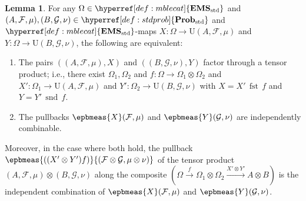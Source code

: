 \documentclass[
  sigconf,
  screen, ]{acmart}
\theoremstyle{definition}
\newtheorem{lemma}[theorem]{Lemma}
\newcommand\calF{\mathcal F}
\newcommand\calG{\mathcal G}
\newcommand\nref[2]{\hyperref[#1]{#2}} \newcommand\checkhigh{{\huge{\color{red}\textbf{TODO: check}}}}
\newcommand\scmfst{\mathop{\nref{app:def:semicartesian-monoidal-category}{\mathrm{fst}}}}
\newcommand\scmsnd{\mathop{\nref{app:def:semicartesian-monoidal-category}{\mathrm{snd}}}}
\newcommand\texforgetmu{\mathrm{U}}
\newcommand\forgetmu{{\nref{def:forgetmu}{\texforgetmu}}}
\newcommand\texStdProb{\mathbf{Prob}_{\rm std}}
\newcommand\StdProb{{\nref{def:stdprob}{\texStdProb}}}
\newcommand\texStdMble{\mathbf{EMS}_{\rm std}}
\newcommand\StdMble{{\nref{def:mblecat}{\texStdMble}}}
\begin{document}
\begin{lemma} \label{app:lem:factor-through-tensor-iff-indep-combable}
  For any $\Omega\in\StdMble$ 
  and $(A,\calF,\mu),(B,\calG,\nu)\in\StdProb$
  and $\StdMble$-maps $X:\Omega\to\forgetmu(A,\calF,\mu)$
  and $Y:\Omega\to\forgetmu(B,\calG,\nu)$,
  the following are equivalent: \begin{enumerate}
    \item The pairs $((A,\calF,\mu),X)$ and $((B,\calG,\nu),Y)$
      factor through a tensor product;
      i.e., there exist $\Omega_1,\Omega_2$ and $f : \Omega\to\Omega_1\otimes\Omega_2$
      and $X':\Omega_1\to \forgetmu{(A,\calF,\mu)}$
      and $Y':\Omega_2\to\forgetmu{(B,\calG,\nu)}$
      with $X = X'\,\scmfst\,f$
      and $Y = Y'\,\scmsnd\,f$.
    \item The pullbacks $\epbmeas{X}(\calF,\mu)$
     and $\epbmeas{Y}(\calG,\nu)$ are independently combinable.
  \end{enumerate}
  Moreover, in the case where both hold,
  the pullback $\epbmeas{((X'\otimes Y')f)}{(\calF\otimes\calG,\mu\otimes\nu)}$
  of the tensor product $(A,\calF,\mu)\otimes(B,\calG,\nu)$
  along the composite $\left(\Omega\xrightarrow f\Omega_1\otimes\Omega_2 \xrightarrow{X'\otimes Y'}A\otimes B\right)$
  is the independent combination of
    $\epbmeas{X}(\calF,\mu)$
     and $\epbmeas{Y}(\calG,\nu)$.
\end{lemma}
\end{document}
